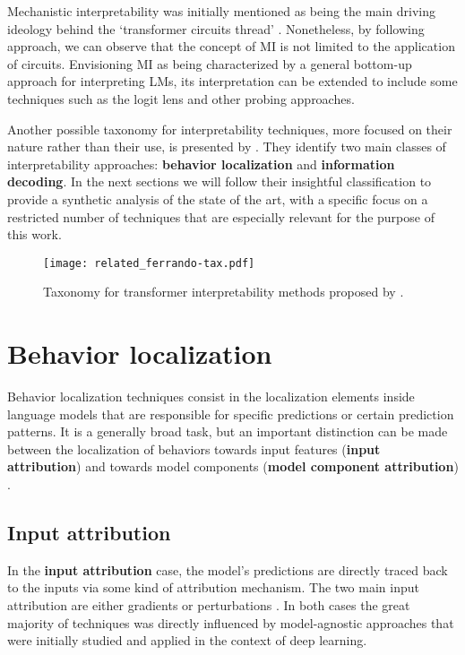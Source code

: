 Mechanistic interpretability was initially mentioned as being the main driving ideology behind the `transformer circuits thread' \cite{elhage2021}.
Nonetheless, by following \citet{rai2024} approach, we can observe that the concept of MI is not limited to the application of circuits.
Envisioning MI as being characterized by a general bottom-up approach for interpreting LMs, its interpretation can be extended to include some  techniques such as the logit lens \cite{nostalgebraist2020} and other probing approaches.

Another possible taxonomy for interpretability techniques, more focused on their nature rather than their use, is presented by \citet{ferrando2024}.
They identify two main classes of interpretability approaches: \textbf{behavior localization} and \textbf{information decoding}.
In the next sections we will follow their insightful classification to provide a synthetic analysis of the state of the art, with a specific focus on a restricted number of techniques that are especially relevant for the purpose of this work.

\begin{figure}[H]
    \centering
    \texttt{[image: related\_ferrando-tax.pdf]}
    \caption{Taxonomy for transformer interpretability methods proposed by \citet{ferrando2024}.}
    \label{fig:related_ferrando-tax}
\end{figure}

\section{Behavior localization}

Behavior localization techniques consist in the localization elements inside language models that are responsible for specific predictions or certain prediction patterns.
It is a generally broad task, but an important distinction can be made between the localization of behaviors towards input features (\textbf{input attribution}) and towards model components (\textbf{model component attribution}) \cite{ferrando2024}. 

\subsection{Input attribution}

In the \textbf{input attribution} case, the model's predictions are directly traced back to the inputs via some kind of attribution mechanism.
The two main input attribution  are either gradients \cite{denil2014, ding2021, sanyal2021, enguehard2023} or perturbations \cite{li2016, amara2024, mohebbi2023}.
In both cases the great majority of techniques was directly influenced by model-agnostic approaches \cite{sundararajan2017, smilkov2017, ribeiro2016, lundberg2017} that were initially studied and applied in the context of deep learning.

